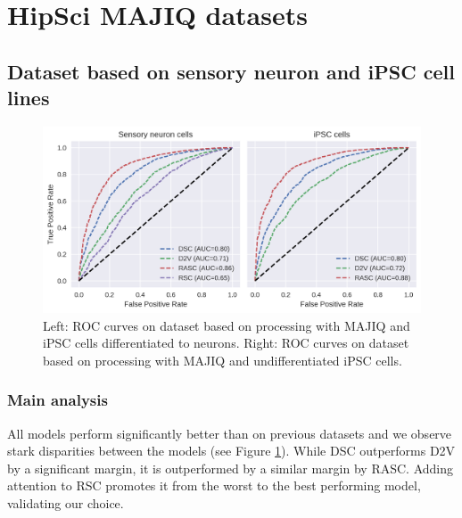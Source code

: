 

\section{HipSci MAJIQ datasets} \label{subsec:majiq}

\subsection{Dataset based on sensory neuron and iPSC cell lines}\label{sec:hipsci_neuron_majiq}



\begin{figure}
	\centering\includegraphics[width=1\textwidth]{../visualizations/ch5-results/majiq_neuron_ipsc_cross_model_roc_auc_comparison.png} 
	\caption{Left: ROC curves on dataset based on processing with MAJIQ and iPSC cells differentiated to neurons. Right: ROC curves on dataset based on processing with MAJIQ and undifferentiated iPSC cells. }
	\label{fig:majiq_rocs}
\end{figure}

\subsubsection{Main analysis}
All models perform significantly better than on previous datasets and we observe stark disparities between the models (see Figure \ref{fig:majiq_rocs}). While DSC outperforms D2V by a significant margin, it is outperformed by a similar margin by RASC. Adding attention to RSC promotes it from the worst to the best performing model, validating our choice. 

